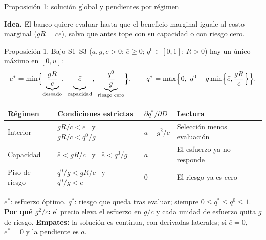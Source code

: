\documentclass[aspectratio=169,10pt,t]{beamer}
\newcommand{\qz}{q^{0}}
\newcommand{\qs}{q^{*}}
\newcommand{\es}{e^{*}}
\newcommand{\eb}{\bar e}
\begin{document}
\begin{frame}{Proposición 1: solución global y pendientes por régimen}
\vspace{1.8mm}
{\small\textbf{Idea.} El banco quiere evaluar hasta que el beneficio marginal iguale al
costo marginal ($gR=ce$), salvo que antes tope con su capacidad o con riesgo cero.\par}
\vspace{.3mm}
\begin{propbox}{Proposición 1. Bajo S1--S3 ($a,g,c>0$; $\eb\ge 0$; $\qz\in[0,1]$; $R>0$) hay un único máximo en $[0,u]$:}
\vspace{-.3mm}
\[
\es=\min\Bigl\{\underbrace{\frac{gR}{c}}_{\text{deseado}},\
\underbrace{\eb\vphantom{\frac{g}{c}}}_{\text{capacidad}},\
\underbrace{\frac{\qz}{g}}_{\text{riesgo cero}}\Bigr\},
\qquad
\qs=\max\Bigl\{0,\ \qz-g\min\Bigl\{\eb,\frac{gR}{c}\Bigr\}\Bigr\}.
\]
\vspace{-3mm}
\end{propbox}
\small
\begin{tabular}{@{}p{.16\linewidth}p{.32\linewidth}p{.12\linewidth}p{.28\linewidth}@{}}
\toprule
\textbf{Régimen} & \textbf{Condiciones estrictas} & $\partial\qs/\partial D$ &
\textbf{Lectura}\\\midrule
Interior & $gR/c<\eb$ \ y \ $gR/c<\qz/g$ & $a-g^{2}/c$ & Selección menos evaluación\\
Capacidad & $\eb<gR/c$ \ y \ $\eb<\qz/g$ & $a$ & El esfuerzo ya no responde\\
Piso de riesgo & $\qz/g<gR/c$ \ y \ $\qz/g<\eb$ & $0$ & El riesgo ya es cero\\\bottomrule
\end{tabular}
\vspace{.8mm}
{\footnotesize $\es$: esfuerzo óptimo. $\qs$: riesgo que queda tras evaluar; siempre
$0\le\qs\le\qz\le 1$.
\textbf{Por qué $g^{2}/c$:} el precio eleva el esfuerzo en $g/c$ y cada unidad de
esfuerzo quita $g$ de riesgo. \textbf{Empates:} la solución es continua, con
derivadas laterales; si $\eb=0$, $\es=0$ y la pendiente es $a$.\par}
\end{frame}
\end{document}
